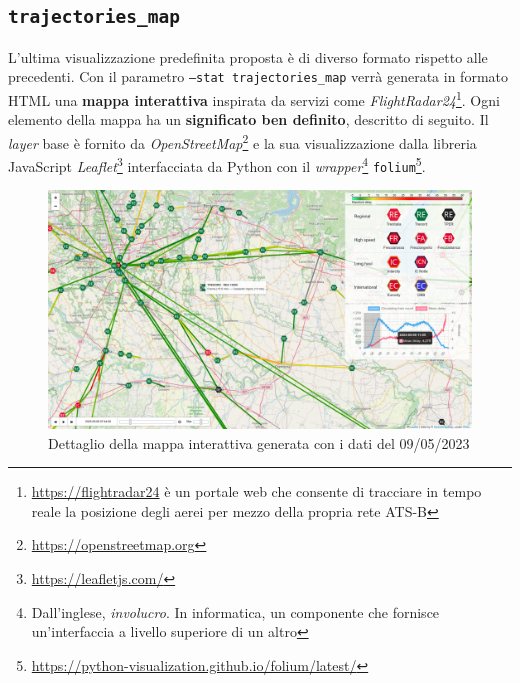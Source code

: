 \documentclass[12pt,italian]{report}
\begin{document}
\subsection{\texttt{trajectories\_map}}
\label{stat_trajectories_map}

L'ultima visualizzazione predefinita proposta è di diverso formato
rispetto alle precedenti.  Con il parametro \texttt{--stat
    trajectories\_\-map} verrà generata in formato HTML una
\textbf{mappa interattiva} inspirata da servizi come
\textit{FlightRadar24}\footnote{\href{https://flightradar24.com}{https://flightradar24}
    è un portale web che consente di tracciare in tempo reale la
    posizione degli aerei per mezzo della propria rete ATS-B}.  Ogni
elemento della mappa ha un \textbf{significato ben definito},
descritto di seguito.  Il \textit{layer} base è fornito da
\textit{OpenStreetMap}\footnote{\href{https://openstreetmap.org}{https://openstreetmap.org}}
e la sua visualizzazione dalla libreria JavaScript
\textit{Leaflet}\footnote{\href{https://leafletjs.com/}{https://leafletjs.com/}}
interfacciata da Python con il \textit{wrapper}\footnote{Dall'inglese,
    \textit{involucro}.  In informatica, un componente che fornisce
    un'interfaccia a livello superiore di un altro}
\texttt{folium}\footnote{\href{https://python-visualization.github.io/folium/latest/}{https://python-visualization.github.io/folium/latest/}}.

\begin{figure} \centering
    \includegraphics[width=1\textwidth]{images/trajectories_map.png}
    \caption{Dettaglio della mappa interattiva generata con i dati del
        09/05/2023}
\end{figure}
\end{document}

